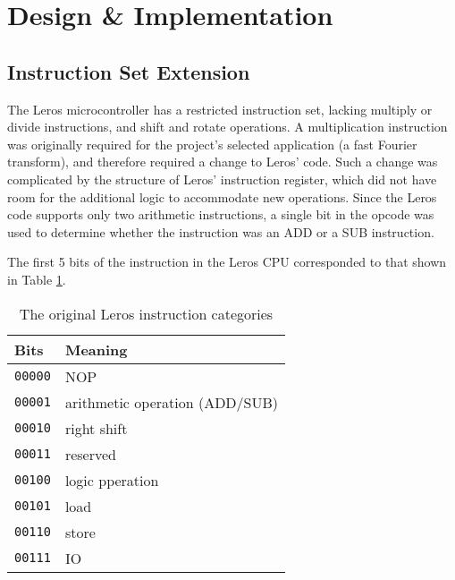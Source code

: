\section{Design \& Implementation}
\subsection{Instruction Set Extension}

The Leros microcontroller has a restricted instruction set, lacking multiply or
divide instructions, and shift and rotate operations. A multiplication
instruction was originally required for the project's selected application (a
fast Fourier transform), and therefore required a change to Leros' code. Such a
change was complicated by the structure of Leros' instruction register, which
did not have room for the additional logic to accommodate new operations. Since
the Leros code supports only two arithmetic instructions, a single bit in the
opcode was used to determine whether the instruction was an ADD or a SUB
instruction.

The first 5 bits of the instruction in the Leros CPU corresponded to that shown
in Table \ref{tab:original-instruction}.

\begin{table}
\centering
\caption{The original Leros instruction categories}
\label{tab:original-instruction}
\begin{tabular}{|l|l|}
\hline
\textbf{Bits} & Meaning \\
\hline
\texttt{00000} & NOP \\
\texttt{00001} & arithmetic operation (ADD/SUB) \\
\texttt{00010} & right shift \\
\texttt{00011} & reserved \\
\texttt{00100} & logic pperation \\
\texttt{00101} & load \\
\texttt{00110} & store \\
\texttt{00111} & IO \\
\hline
\end{tabular}
\end{table}

